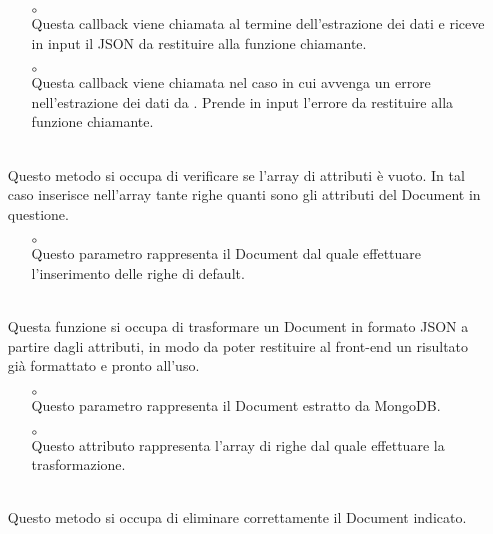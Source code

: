 \begin{itemize}
\begin{itemize}
\item[$\circ$]  \\ Questa callback viene chiamata al termine dell'estrazione dei dati e riceve in input il JSON da restituire alla funzione chiamante.
\item[$\circ$]  \\ Questa callback viene chiamata nel caso in cui avvenga un errore nell'estrazione dei dati da . Prende in input l'errore da restituire alla funzione chiamante.
\end{itemize}
\item[]  \\ Questo metodo si occupa di verificare se l'array di attributi è vuoto. In tal caso inserisce nell'array tante righe quanti sono gli attributi del Document in questione.
\begin{itemize}\addtolength{\itemsep}{-0.5\baselineskip}
\item[$\circ$]  \\ Questo parametro rappresenta il Document dal quale effettuare l'inserimento delle righe di default.
\end{itemize}
\item[]  \\ Questa funzione si occupa di trasformare un Document in formato JSON a partire dagli attributi, in modo da poter restituire al front-end un risultato già formattato e pronto all'uso.
\begin{itemize}\addtolength{\itemsep}{-0.5\baselineskip}
\item[$\circ$]  \\ Questo parametro rappresenta il Document estratto da MongoDB.
\item[$\circ$]  \\ Questo attributo rappresenta l'array di righe dal quale effettuare la trasformazione.
\end{itemize}
\item[]  \\ Questo metodo si occupa di eliminare correttamente il Document indicato.
\begin{itemize}\addtolength{\itemsep}{-0.5\baselineskip}

\end{itemize}
\end{itemize}
